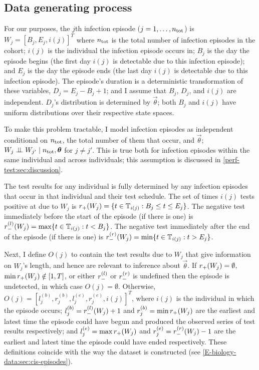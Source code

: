 \documentclass[thesis.tex]{subfiles}
\begin{document}
\subsection{Data generating process} \label{perf-test:sec:dgp}

For our purposes, the $j$th infection episode ($j = 1, \dots, n_\text{tot}$) is $W_j = [B_j, E_j, i(j)]^T$ where $n_\text{tot}$ is the total number of infection episodes in the cohort; $i(j)$ is the individual the infection episode occurs in; $B_j$ is the day the episode begins (the first day $i(j)$ is detectable due to this infection episode); and $E_j$ is the day the episode ends (the last day $i(j)$ is detectable due to this infection episode).
The episode's duration is a deterministic transformation of these variables, $D_j = E_j - B_j + 1$; and I assume that $B_j$, $D_j$, and $i(j)$ are independent.
$D_j$'s distribution is determined by $\vec{\theta}$; both $B_j$ and $i(j)$ have uniform distributions over their respective state spaces.

To make this problem tractable, I model infection episodes as independent conditional on $n_\text{tot}$, the total number of them that occur, and $\vec{\theta}$; \ie $W_j \mathrel{\perp\!\!\!\perp} W_{j'} \mid n_\text{tot}, \bm{\theta}$ for $j \neq j'$.
This is true both for infection episodes within the same individual and across individuals; this assumption is discussed in \cref{perf-test:sec:discussion}.

The test results for any individual is fully determined by any infection episodes that occur in that individual and their test schedule.
The set of times $i(j)$ tests positive at due to $W_j$ is $r_{+}(W_j) = \{ t \in \mathbb{T}_{i(j)} : B_j \leq t \leq E_j \}$.
The negative test immediately before the start of the episode (if there is one) is $r_{-}^{(l)}(W_j) = \max \{ t \in \mathbb{T}_{i(j)} : t < B_j \}$.
The negative test immediately after the end of the episode (if there is one) is $r_{-}^{(r)}(W_j) = \min \{ t \in \mathbb{T}_{i(j)} : t > E_j \}$.

Next, I define $O(j)$ to contain the test results due to $W_j$ that give information on $W_j$'s length, and hence are relevant to inference about $\vec{\theta}$.
If $r_{+}(W_j) = \emptyset$, $\min r_{+}(W_j) \notin [1, T]$, or either $r_{-}^{(l)}$ or $r_{-}^{(r)}$ is undefined then the episode is undetected, in which case $O(j) = \emptyset$.
Otherwise, $O(j) = [l_j^{(b)}, r_j^{(b)}, l_j^{(e)}, r_j^{(e)}, i(j)]^T$, where $i(j)$ is the individual in which the episode occurs; $l_j^{(b)} = r_{-}^{(l)}(W_j) + 1$ and $r_j^{(b)} = \min r_{+}(W_j)$ are the earliest and latest time the episode could have begun and produced the observed series of test results respectively; and $l_j^{(e)} = \max r_{+}(W_j)$ and $r_j^{(e)} = r_{-}^{(r)}(W_j) - 1$ are the earliest and latest time the episode could have ended respectively.
These definitions coincide with the way the dataset is constructed (see \cref{E-biology-data:sec:cis-episodes}).
\end{document}
